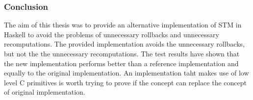 \subsubsection{Conclusion}
The aim of this thesis was to provide an alternative implementation of STM in Haskell to avoid the 
problems of unnecessary rollbacks and unnecessary recomputations. The provided implementation 
avoids the unnecessary rollbacks, but not the the unnecessary recomputations. The test results 
have shown that the new implementation performs better than a reference implementation and equally
to the original implementation. An implementation taht makes use of low level C primitives is 
worth trying to prove if the concept can replace the concept of original implementation.  